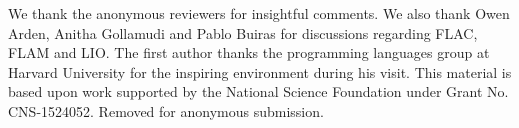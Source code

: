 \ifx\review\undefined
We thank the anonymous reviewers for insightful comments. We also thank Owen Arden, Anitha Gollamudi and Pablo Buiras for discussions regarding FLAC, FLAM and LIO. The first author thanks the programming languages group at Harvard University for the inspiring environment during his visit. This material is based upon work supported by the National Science Foundation under Grant No. CNS-1524052.
\else
Removed for anonymous submission.
\fi